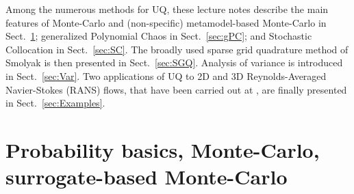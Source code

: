\documentclass{eurosae}
\newcommand{\sref}[1]{Sect.~\ref{#1}}
\begin{document}
Among the numerous methods for UQ, these lecture notes describe the main features of Monte-Carlo and (non-specific) metamodel-based Monte-Carlo in \sref{sec:MC}; generalized Polynomial Chaos in \sref{sec:gPC}; and Stochastic Collocation in \sref{sec:SC}. The broadly used sparse grid quadrature method of Smolyak \cite{Smo_63} is then presented in \sref{sec:SGQ}. Analysis of variance is introduced in \sref{sec:Var}. Two applications of UQ to 2D and 3D Reynolds-Averaged Navier-Stokes (RANS) flows, that have been carried out at \Onera, are finally presented in \sref{sec:Examples}.
%
\section{Probability basics, Monte-Carlo, surrogate-based Monte-Carlo}\label{sec:MC}
%
\end{document}
